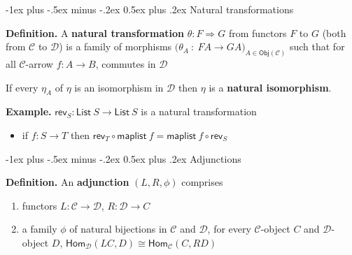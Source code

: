 \documentclass[10pt,landscape,a4paper]{article}
\makeatletter
\renewcommand{\section}{\@startsection{section}{1}{0mm}%
                                {-1ex plus -.5ex minus -.2ex}%
                                {0.5ex plus .2ex}%
                                {\normalfont\large\bfseries}}
\makeatother
\begin{document}
\begin{multicols}{3}
\section{Natural transformations}

\textbf{Definition.} A \textbf{natural transformation} $\theta : F \Rightarrow G$ from functors $F$ to $G$ (both from $\mathcal C$ to $\mathcal D$) is a family of morphisms $\Big (\theta_A ~:~ FA \rightarrow GA \Big )_{A \in \mathsf{Obj} (\mathcal{C})}$ such that for all $\mathcal C$-arrow $f : A \rightarrow B$, commutes in $\mathcal D$
\vspace{-0.3cm}
\begin{center}
\end{center}
\vspace{-0.2cm}

If every $\eta_A$ of $\eta$ is an isomorphism in $\mathcal D$ then $\eta$ is a \textbf{natural isomorphism}.

\textbf{Example.} $\mathsf{rev}_S : \mathsf{List}~S \rightarrow \mathsf{List}~S$ is a natural transformation
\begin{itemize}
\item if $f : S \rightarrow T$ then $\mathsf{rev}_T \circ \mathsf{maplist}~f = \mathsf{maplist}~f \circ \mathsf{rev}_S$
\end{itemize}

\section{Adjunctions}

\textbf{Definition.} An \textbf{adjunction} $(L, R, \phi)$ comprises
\begin{enumerate}\setlength{\itemsep}{-0.7mm}
\item functors $L : \mathcal C \rightarrow \mathcal D$, $R : \mathcal D \rightarrow C$
\item a family $\phi$ of natural bijections in $\mathcal C$ and $\mathcal D$, for every $\mathcal C$-object $C$ and $\mathcal D$-object $D$, \quad
  $\mathsf{Hom}_{\mathcal{D}} (L C, D) \cong \mathsf{Hom}_{\mathcal{C}} (C, R D)$


\end{enumerate}
\end{multicols}
\end{document}
